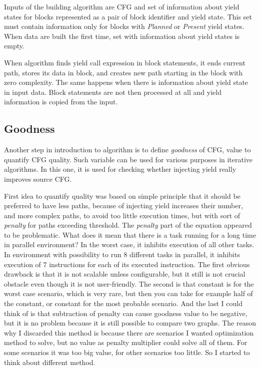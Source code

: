 Inputs of the building algorithm are CFG and set of information about yield states for blocks represented as a pair of block identifier and yield state. This set must contain information only for blocks with \emph{Planned} or \emph{Present} yield states. When data are built the first time, set with information about yield states is empty.

When algorithm finds yield call expression in block statements, it ends current path, stores its data in block, and creates new path starting in the block with zero complexity. The same happens when there is information about yield state in input data. Block statements are not then processed at all and yield information is copied from the input.

\subsection{Goodness}
Another step in introduction to algorithm is to define \emph{goodness} of CFG, value to quantify CFG quality. Such variable can be used for various purposes in iterative algorithms. In this one, it is used for checking whether injecting yield really improves source CFG.

First idea to quantify quality was based on simple principle that it should be preferred to have less paths, because of injecting yield increases their number, and more complex paths, to avoid too little execution times, but with sort of \emph{penalty} for paths exceeding threshold. The  \emph{penalty} part of the equation appeared to be problematic. What does it mean that there is a task running for a long time in parallel environment? In the worst case, it inhibits execution of all other tasks. In environment with possibility to run 8 different tasks in parallel, it inhibits execution of 7 instructions for each of its executed instruction. The first obvious drawback is that it is not scalable unless configurable, but it still is not crucial obstacle even though it is not user-friendly. The second is that constant is for the worst case scenario, which is very rare, but then you can take for example half of the constant, or constant for the most probable scenario. And the last I could think of is that subtraction of penalty can cause goodness value to be negative, but it is no problem because it is still possible to compare two graphs. The reason why I discarded this method is because there are scenarios I wanted optimization method to solve, but no value as penalty multiplier could solve all of them. For some scenarios it was too big value, for other scenarios too little. So I started to think about different method.

